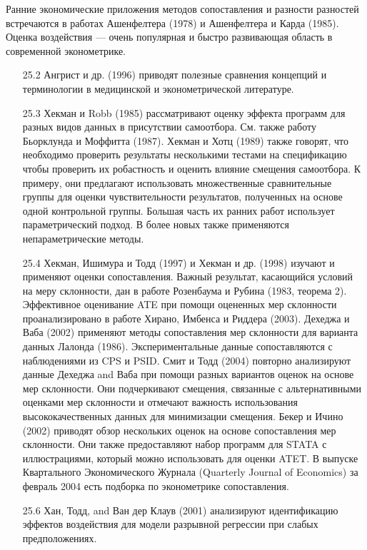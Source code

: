Ранние экономические приложения методов сопоставления и разности разностей встречаются в работах Ашенфелтера (1978) и Ашенфелтера и Карда (1985). Оценка воздействия --- очень популярная и быстро развивающая область в современной эконометрике. 
\begin{enumerate}
\item[25.2] Ангрист и др. (1996) приводят полезные сравнения концепций и терминологии в медицинской и эконометрической литературе.  
\item[25.3] Хекман и Robb (1985) рассматривают оценку эффекта программ для разных видов данных в присутствии самоотбора. См. также работу Бьорклунда и Моффитта (1987). Хекман и Хотц (1989) также говорят, что необходимо проверить результаты несколькими тестами на спецификацию чтобы проверить их робастность и оценить влияние смещения самоотбора. К примеру, они предлагают использовать множественные сравнительные группы для оценки чувствительности результатов, полученных на основе одной контрольной группы. Большая часть их ранних работ использует параметрический подход. В более новых также применяются непараметрические методы. 
\item[25.4] Хекман, Ишимура и Тодд (1997) и Хекман и др. (1998) изучают и применяют оценки сопоставления. Важный результат, касающийся условий на меру склонности, дан в работе Розенбаума и Рубина (1983, теорема 2). Эффективное оценивание ATE при помощи оцененных мер склонности проанализировано в работе Хирано, Имбенса и Риддера (2003). Дехеджа и Ваба (2002) применяют методы сопоставления мер склонности для варианта данных Лалонда (1986). Экспериментальные данные сопоставляются с наблюдениями из CPS и PSID. Смит и Тодд (2004) повторно анализируют данные Дехеджа and Ваба при помощи разных вариантов оценок на основе мер склонности. Они подчеркивают смещения, связанные с альтернативными оценками мер склонности и отмечают важность использования высококачественных данных для минимизации смещения. Бекер и Ичино (2002) приводят обзор нескольких оценок на основе сопоставления мер склонности. Они также предоставляют набор программ для STATA с иллюстрациями, который можно использовать для оценки ATET. В выпуске Квартального Экономического Журнала (Quarterly Journal of Economics) за февраль 2004 есть подборка по эконометрике сопоставления. 
\item[25.6] Хан, Тодд, and Ван дер Клаув (2001) анализируют идентификацию эффектов воздействия для модели разрывной регрессии при слабых предположениях.  

\end{enumerate}
